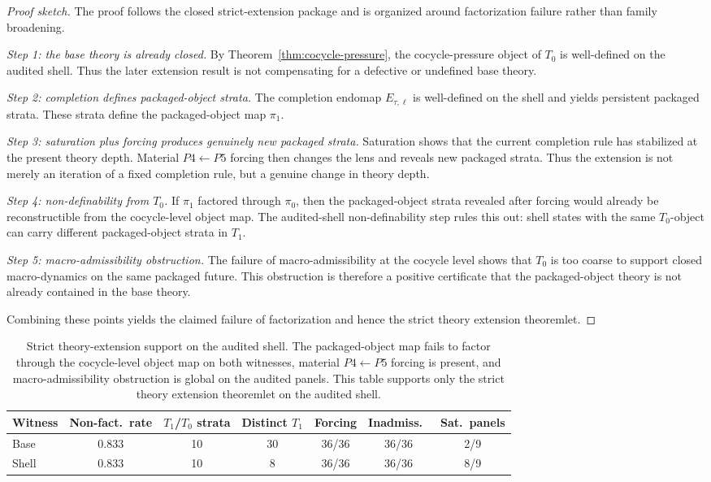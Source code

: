\documentclass[11pt]{article}
\theoremstyle{definition}
\newcommand{\Tzero}{T_0}
\newcommand{\Tone}{T_1}
\begin{document}
\begin{proof}[Proof sketch]
The proof follows the closed strict-extension package and is organized around factorization failure rather than family broadening.

\smallskip
\noindent\emph{Step 1: the base theory is already closed.}
By Theorem~\ref{thm:cocycle-pressure}, the cocycle-pressure object of \(\Tzero\) is well-defined on the audited shell. Thus the later extension result is not compensating for a defective or undefined base theory.

\smallskip
\noindent\emph{Step 2: completion defines packaged-object strata.}
The completion endomap \(E_{\tau,\ell}\) is well-defined on the shell and yields persistent packaged strata. These strata define the packaged-object map \(\pi_1\).

\smallskip
\noindent\emph{Step 3: saturation plus forcing produces genuinely new packaged strata.}
Saturation shows that the current completion rule has stabilized at the present theory depth. Material \(P4\leftarrow P5\) forcing then changes the lens and reveals new packaged strata. Thus the extension is not merely an iteration of a fixed completion rule, but a genuine change in theory depth.

\smallskip
\noindent\emph{Step 4: non-definability from \(\Tzero\).}
If \(\pi_1\) factored through \(\pi_0\), then the packaged-object strata revealed after forcing would already be reconstructible from the cocycle-level object map. The audited-shell non-definability step rules this out: shell states with the same \(\Tzero\)-object can carry different packaged-object strata in \(\Tone\).

\smallskip
\noindent\emph{Step 5: macro-admissibility obstruction.}
The failure of macro-admissibility at the cocycle level shows that \(\Tzero\) is too coarse to support closed macro-dynamics on the same packaged future. This obstruction is therefore a positive certificate that the packaged-object theory is not already contained in the base theory.

Combining these points yields the claimed failure of factorization and hence the strict theory extension theoremlet.
\end{proof}

\begin{table}[t]
\caption{Strict theory-extension support on the audited shell.
The packaged-object map fails to factor through the cocycle-level object map
on both witnesses, material $P4\!\leftarrow\!P5$ forcing is present,
and macro-admissibility obstruction is global on the audited panels.
This table supports only the strict theory extension theoremlet
on the audited shell.}
\label{tbl:strict-theory-extension}
\centering
\small
\begin{tabular}{@{}l c c c c c c@{}}
\toprule
Witness & Non-fact.\ rate & $T_1$/$T_0$ strata & Distinct $T_1$ & Forcing & Inadmiss.\ & Sat.\ panels \\
\midrule
Base  & 0.833 & 10 & 30 & 36/36 & 36/36 & 2/9 \\
Shell & 0.833 & 10 &  8 & 36/36 & 36/36 & 8/9 \\
\bottomrule
\end{tabular}
\end{table}
 
\end{document}
